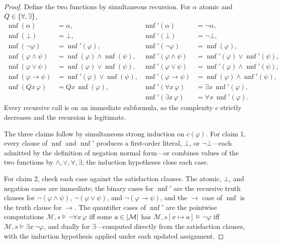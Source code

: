 \documentclass[11pt,oneside,openany]{book}
\theoremstyle{definition}
\theoremstyle{plain}
\theoremstyle{remark}
\DeclarePairedDelimiter{\set}{\lbrace}{\rbrace}
\DeclarePairedDelimiter{\abs}{\lvert}{\rvert}
\newcommand{\Meta}{\mathcal{M}}
\newcommand{\entails}{\models}
\newcommand{\bottom}{\bot}
\begin{document}
\begin{proof}
Define the two functions by simultaneous recursion.  For \(\alpha\)
atomic and \(Q\in\set{\forall,\exists}\),
\[
\begin{aligned}
 \operatorname{nnf}(\alpha)&=\alpha,
 &\operatorname{nnf}'(\alpha)&=\neg\alpha,\\
 \operatorname{nnf}(\bottom)&=\bottom,
 &\operatorname{nnf}'(\bottom)&=\neg\bottom,\\
 \operatorname{nnf}(\neg\varphi)&=\operatorname{nnf}'(\varphi),
 &\operatorname{nnf}'(\neg\varphi)&=\operatorname{nnf}(\varphi),\\
 \operatorname{nnf}(\varphi\land\psi)&=
   \operatorname{nnf}(\varphi)\land\operatorname{nnf}(\psi),
 &\operatorname{nnf}'(\varphi\land\psi)&=
   \operatorname{nnf}'(\varphi)\lor\operatorname{nnf}'(\psi),\\
 \operatorname{nnf}(\varphi\lor\psi)&=
   \operatorname{nnf}(\varphi)\lor\operatorname{nnf}(\psi),
 &\operatorname{nnf}'(\varphi\lor\psi)&=
   \operatorname{nnf}'(\varphi)\land\operatorname{nnf}'(\psi),\\
 \operatorname{nnf}(\varphi\to\psi)&=
   \operatorname{nnf}'(\varphi)\lor\operatorname{nnf}(\psi),
 &\operatorname{nnf}'(\varphi\to\psi)&=
   \operatorname{nnf}(\varphi)\land\operatorname{nnf}'(\psi),\\
 \operatorname{nnf}(Qx\,\varphi)&=Qx\,\operatorname{nnf}(\varphi),
 &\operatorname{nnf}'(\forall x\,\varphi)&=
   \exists x\,\operatorname{nnf}'(\varphi),\\
 &&\operatorname{nnf}'(\exists x\,\varphi)&=
   \forall x\,\operatorname{nnf}'(\varphi).
\end{aligned}
\]
Every recursive call is on an immediate subformula, so the complexity
\(c\) strictly decreases and the recursion is legitimate.

The three claims follow by simultaneous strong induction on
\(c(\varphi)\).  For claim 1, every clause of \(\operatorname{nnf}\) and
\(\operatorname{nnf}'\) produces a first-order literal, \(\bottom\), or
\(\neg\bottom\)---each admitted by the definition of negation normal
form---or combines values of the two functions by
\(\land,\lor,\forall,\exists\); the induction hypotheses close each case.

For claim 2, check each case against the satisfaction clauses.  The
atomic, \(\bottom\), and negation cases are immediate; the binary cases
for \(\operatorname{nnf}'\) are the recursive truth clauses for
\(\neg(\varphi\land\psi)\), \(\neg(\varphi\lor\psi)\), and
\(\neg(\varphi\to\psi)\), and the \(\to\) case of \(\operatorname{nnf}\)
is the truth clause for \(\to\).  The quantifier cases of
\(\operatorname{nnf}'\) are the pointwise computations
\(\Meta,s\entails\neg\forall x\,\varphi\) iff some \(a\in\abs{\Meta}\) has
\(\Meta,s[x\mapsto a]\entails\neg\varphi\) iff
\(\Meta,s\entails\exists x\,\neg\varphi\), and dually for
\(\exists\)---computed directly from the satisfaction clauses, with the
induction hypothesis applied under each updated assignment.


\end{proof}
\end{document}
